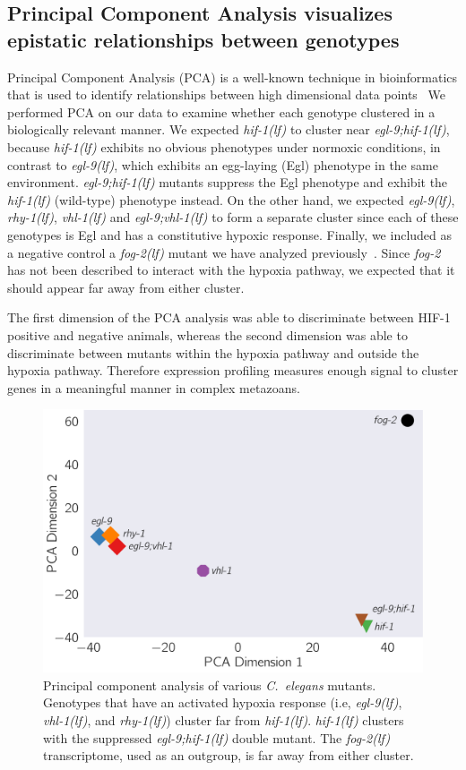 \documentclass[9pt,twocolumn,twoside]{pnas-new}
\newcommand{\cel}{\emph{C.~elegans}}
\newcommand{\gene}[1]{\emph{#1}}
\newcommand{\fog}{\emph{fog-2(lf)}}
\newcommand{\egl}{\emph{egl-9(lf)}}
\newcommand{\rhy}{\emph{rhy-1(lf)}}
\newcommand{\vhl}{\emph{vhl-1(lf)}}
\newcommand{\eglvhl}{\emph{egl-9;vhl-1(lf)}}
\newcommand{\eglhif}{\emph{egl-9;hif-1(lf)}}
\newcommand{\hif}{\emph{hif-1(lf)}}
\newcommand{\hifp}{HIF-1}
\begin{document}
\subsection*{Principal Component Analysis visualizes epistatic relationships between genotypes}
\label{sub:Clustering}

Principal Component Analysis (PCA) is a well-known technique in bioinformatics that is
used to identify relationships between high dimensional data points~\cite{Yeung2001}
We performed PCA on our data to examine whether each genotype clustered in a biologically
relevant manner. We expected \hif{} to cluster near \eglhif{}, because
\hif{} exhibits no obvious phenotypes under normoxic conditions, in contrast to
\egl{}, which exhibits an egg-laying (Egl) phenotype in the same environment.
\eglhif{} mutants suppress the Egl phenotype and exhibit the \hif{} (wild-type) phenotype
instead. On the other hand, we expected \egl{}, \rhy{}, \vhl{} and \eglvhl{} to
form a separate cluster since each of these genotypes is Egl and has a constitutive
hypoxic response. Finally, we included as a negative control a \fog{} mutant we
have analyzed previously~\cite{Angeles-Albores2016a}. Since \gene{fog-2} has not
been described to interact with the hypoxia pathway, we expected that it should
appear far away from either cluster.

The first dimension of the PCA analysis was able to discriminate between \hifp{}
positive and negative animals, whereas the second dimension was able to discriminate
between mutants within the hypoxia pathway and outside the hypoxia pathway.
Therefore expression profiling measures enough signal to cluster genes in a
meaningful manner in complex metazoans.

\begin{figure}%
\centering
\includegraphics[width=0.75\linewidth]{figs/pca.pdf}
\caption{
Principal component analysis of various \cel{} mutants. Genotypes that have an
activated hypoxia response (i.e, \egl{}, \vhl{}, and \rhy{}) cluster far
from \hif{}. \hif{} clusters with the suppressed \eglhif{} double mutant.
The \fog{} transcriptome, used as an outgroup, is far away from either cluster.
}
\label{fig:dendrogram}
\end{figure}
\end{document}
